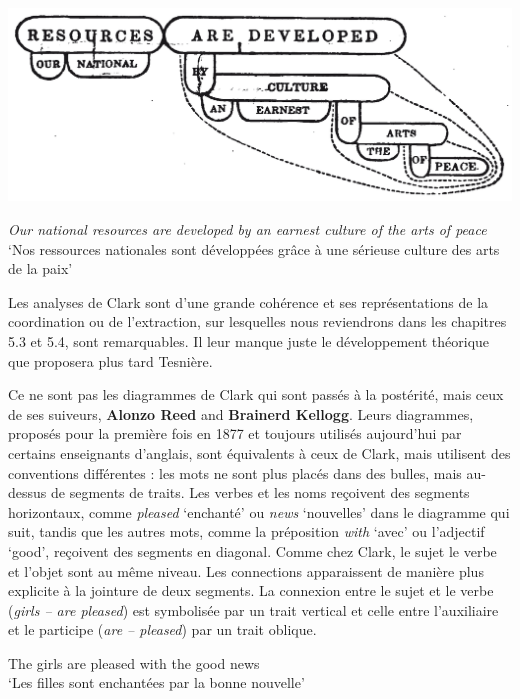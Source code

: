 {    %
    \includegraphics[width=\textwidth]{figures/vol1syntaxe2-img013.png}

    \textit{Our national resources are developed by an earnest culture of the arts of peace}\\
    ‘Nos ressources nationales sont développées grâce à une sérieuse culture des arts de la paix’

    Les analyses de Clark sont d’une grande cohérence et ses représentations de la coordination ou de l’extraction, sur lesquelles nous reviendrons dans les chapitres 5.3 et 5.4, sont remarquables. Il leur manque juste le développement théorique que proposera plus tard Tesnière.

    Ce ne sont pas les diagrammes de Clark qui sont passés à la postérité, mais ceux de ses suiveurs, \textbf{Alonzo Reed} and \textbf{Brainerd Kellogg}. Leurs diagrammes, proposés pour la première fois en 1877 et toujours utilisés aujourd’hui par certains enseignants d’anglais, sont équivalents à ceux de Clark, mais utilisent des conventions différentes : les mots ne sont plus placés dans des bulles, mais au-dessus de segments de traits. Les verbes et les noms reçoivent des segments horizontaux, comme \textit{pleased} ‘enchanté’ ou \textit{news} ‘nouvelles’ dans le diagramme qui suit, tandis que les autres mots, comme la préposition \textit{with} ‘avec’ ou l’adjectif ‘good’, reçoivent des segments en diagonal. Comme chez Clark, le sujet le verbe et l’objet sont au même niveau. Les connections apparaissent de manière plus explicite à la jointure de deux segments. La connexion entre le sujet et le verbe (\textit{girls – are pleased}) est symbolisée par un trait vertical et celle entre l’auxiliaire et le participe (\textit{are – pleased}) par un trait oblique.

    \ea
    {The girls are pleased with the good news}\\
    ‘Les filles sont enchantées par la bonne nouvelle’

}
